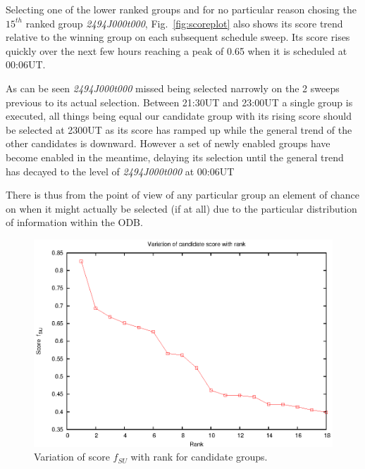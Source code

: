 {{Selecting one of the lower ranked groups and for no particular reason chosing the $15^{th}$ ranked group \emph{2494J000t000}, Fig.~\ref{fig:scoreplot} also shows its score trend relative to the winning group on each subsequent schedule sweep. Its score rises quickly over the next few hours reaching a peak of 0.65 when it is scheduled at 00:06UT. 

 As can be seen \emph{2494J000t000} missed being selected narrowly on the 2 sweeps previous to its actual selection. 
Between 21:30UT and 23:00UT a single group is executed, all things being equal our candidate group with its rising score should be selected at 2300UT as its score has ramped up while the general trend of the other candidates is downward. However a set of newly enabled groups have become enabled in the meantime, delaying its selection until the general trend has decayed to the level of \emph{2494J000t000} at 00:06UT

There is thus from the point of view of any particular group an element of chance on when it might actually be selected (if at all) due to the particular distribution of information within the ODB.

\begin{figure}[h]
\begin{center}
  \includegraphics[scale=1.0, angle=0]{figures/rankplot.eps}
  \caption[Variation of score $f_{SU}$ with rank for candidate groups.]{Variation of score $f_{SU}$ with rank for candidate groups.}
  \label{fig:rankplot}
\end{center}
\end{figure}


}}
